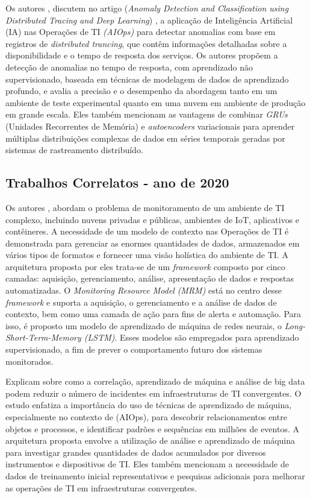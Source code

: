 Os autores \cite{8752866}, discutem no artigo (\textit{Anomaly Detection and Classification using Distributed Tracing and Deep Learning}) , a aplicação de Inteligência Artificial (IA) nas Operações de TI \textit{(AIOps)} para detectar anomalias com base em registros de \textit{distributed trancing}, que contêm informações detalhadas sobre a disponibilidade e o tempo de resposta dos serviços. Os autores propõem a detecção de anomalias no tempo de resposta, com aprendizado não supervisionado, baseada em técnicas de modelagem de dados de aprendizado profundo, e avalia a precisão e o desempenho da abordagem tanto em um ambiente de teste experimental quanto em uma nuvem em ambiente de produção em grande escala. Eles também mencionam as vantagens de combinar \textit{GRUs} (Unidades Recorrentes de Memória) e \textit{autoencoders} variacionais para aprender múltiplas distribuições complexas de dados em séries temporais geradas por sistemas de rastreamento distribuído.


\subsection{Trabalhos Correlatos - ano de 2020}\label{trab_correlatos_20}


Os autores \cite{9156101} ,  abordam o problema de monitoramento de um ambiente de TI complexo, incluindo nuvens privadas e públicas, ambientes de IoT, aplicativos e contêineres. A necessidade de um modelo de contexto nas Operações de TI é demonstrada para gerenciar as enormes quantidades de dados, armazenados em vários tipos de formatos e fornecer uma visão holística do ambiente de TI. A arquitetura proposta por eles trata-se de um \textit{framework} composto por cinco camadas: aquisição, gerenciamento, análise, apresentação de dados e respostas automatizadas. O \textit{Monitoring Resource Model} \textit{(MRM)} está no centro desse \textit{framework} e suporta a aquisição, o gerenciamento e a análise de dados de contexto, bem como uma camada de ação para fins de alerta e automação. Para isso, é proposto um modelo de aprendizado de máquina de redes neurais, o\textit{ Long-Short-Term-Memory (LSTM)}. Esses modelos são empregados para aprendizado supervisionado, a fim de prever o comportamento futuro dos sistemas monitorados.


\cite{9311349} Explicam sobre como a correlação, aprendizado de máquina e análise de big data podem reduzir o número de incidentes em infraestruturas de TI convergentes. O estudo enfatiza a importância do uso de técnicas de aprendizado de máquina, especialmente no contexto de (AIOps), para descobrir relacionamentos entre objetos e processos, e identificar padrões e sequências em milhões de eventos. A arquitetura proposta envolve a utilização de análise e aprendizado de máquina para investigar grandes quantidades de dados acumulados por diversos instrumentos e dispositivos de TI. Eles também mencionam a necessidade de dados de treinamento inicial representativos e pesquisas adicionais para melhorar as operações de TI em infraestruturas convergentes.

